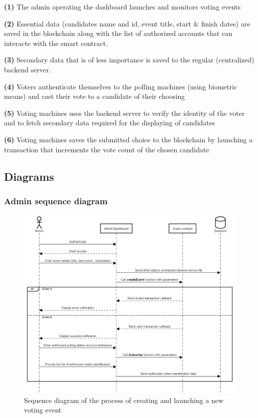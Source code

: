 \begin{list}{}{}
\item \textbf{(1)} The admin operating the dashboard launches and monitors voting events
\item \textbf{(2)} Essential data (candidates name and id, event title, start \& finish dates) are saved in the blockchain along with the list of authorized accounts that can interacte with the smart contract.
\item \textbf{(3)} Secondary data that is of less importance is saved to the regular (centralized) backend server.
\item \textbf{(4)} Voters authenticate themselves to the polling machines (using biometric means) and cast their vote to a candidate of their choosing
\item \textbf{(5)} Voting machines uses the backend server to verify the identity of the voter and to fetch secondary data required for the displaying of candidates
\item \textbf{(6)} Voting machines saves the submitted choice to the blockchain by launching a transaction that increments the vote count of the chosen candidate
\end{list}

\subsection{Diagrams}
\subsubsection{Admin sequence diagram}

\begin{figure}[H]
	\centering
		\includegraphics[width=14cm]{images/chapter3/admin_sequence_diagram.png}
		\caption{{\footnotesize Sequence diagram of the process of creating and launching a new voting event}}
\end{figure}

